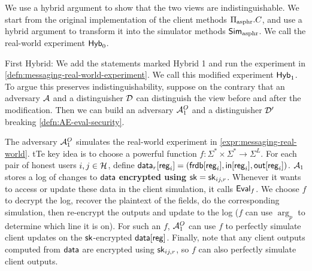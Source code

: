 We use a hybrid argument to show that the two views are indistinguishable. We start from the original implementation of the client methods $\Pi_{\text{asphr}}.C$, and use a hybrid argument to transform it into the simulator methods $\mathsf{Sim}_{\text{asphr}}$. We call the real-world experiment $\mathsf{Hyb}_0$.  




First Hybrid: We add the statements marked Hybrid 1 and run the experiment in \cref{defn:messaging-real-world-experiment}. We call this modified experiment $\mathsf{Hyb}_1$. To argue this preserves indistinguishability, suppose on the contrary that an adversary $\mathcal{A}$ and a distinguisher $\mathcal{D}$ can distinguish the view before and after the modification. Then we can build an adversary $\mathcal{A}_1^O$ and a distinguisher $\mathcal{D}'$ breaking \cref{defn:AE-eval-security}. 

The adversary $\mathcal{A}_1^O$ simulates the real-world experiment in \cref{expr:messaging-real-world}. tTe key idea is to choose a powerful function $f: \Sigma^* \times \Sigma^* \to \Sigma^L$. For each pair of honest users $i, j \in \mathcal{H}$, define $\mathsf{data}_r[\mathsf{reg}_i] = (\mathsf{frdb}[\mathsf{reg}_i], \mathsf{in}[\mathsf{reg}_i], \mathsf{out}[\mathsf{reg}_i])$. $\mathcal{A}_1$ stores a log of changes to $\mathsf{data}$ \textbf{encrypted using ${\mathsf{sk}} = {\mathsf{sk}}_{ij, r}$}. Whenever it wants to access or update these data in the client simulation, it calls $\mathsf{Eval}_f$. We choose $f$ to decrypt the log, recover the plaintext of the fields, do the corresponding simulation, then re-encrypt the outputs and update to the log ($f$ can use $\arg_p$ to determine which line it is on). For such an $f$, $\mathcal{A}_1^O$ can use $f$ to perfectly simulate client updates on the ${\mathsf{sk}}$-encrypted $\mathsf{data}[\mathsf{reg}]$. Finally, note that any client outputs computed from $\mathsf{data}$ are encrypted using ${\mathsf{sk}}_{ij, r}$, so $f$ can also perfectly simulate client outputs. 

